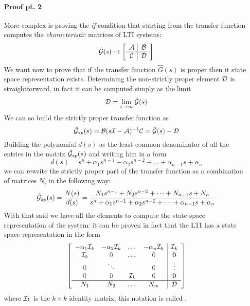 		\paragraph{Proof pt. 2} More complex is proving the \textit{if} condition that starting from the transfer function computes the \textit{characteristic} matrices of LTI systems:
		\[ \hat {\mathcal{G}}(s) \mapsto \begin{bmatrix} \begin{array}{c|c}
				\mathcal{A} & \mathcal{B} \\ \hline \mathcal{C} & \mathcal{D}
		\end{array} \end{bmatrix}  \]
		We want now to prove that if the transfer function $\hat G(s)$ is proper then it state space representation exists. Determining the non-strictly proper element $\mathcal{D}$ is straightforward, in fact it can be computed simply as the limit
		\[ \mathcal D = \lim_{s\rightarrow \infty} \hat {\mathcal{G}}(s) \]
		We can so build the strictly proper transfer function as
		\[ \hat {\mathcal{G}}_{sp}(s) = \mathcal{B}(s\mathcal{I} - \mathcal{A})^{-1}\mathcal{C} = \hat {\mathcal{G}}(s) - \mathcal{D}\]
		Building the polynomial $d(s)$ as the least common denominator of all the entries in the matrix $\hat {\mathcal{G}}_{sp}(s)$ and writing him in a form
		\[ d(s) = s^n + \alpha_1 s^{n-1} + \alpha_2 s^{n-2}+ \dots + \alpha_{n-1} s + \alpha_n \]
		we can rewrite the strictly proper part of the transfer function as a combination of matrices $N_i$ in the following way:
		\[ \hat {\mathcal{G}}_{sp}(s) = \frac{N(s)}{d(s)} = \frac{N_1 s^{n-1} + N_2 s^{n-2} + \dots + N_{n-1} s + N_n }{ s^n + \alpha_1 s^{n-1} + \alpha_2 s^{n-2}+ \dots + \alpha_{n-1} s + \alpha_n} \]
		With that said we have all the elements to compute the state space representation of the system: it can be proven in fact that the LTI has a state space representation in the form
		\begin{equation} \label{eq:dyn:Gtostaterep}
			\begin{bmatrix} \begin{array}{ c c c c | c}
				-\alpha_1 \mathcal{I}_k & - \alpha_2 \mathcal{I}_k & \dots & - \alpha_n \mathcal{I}_k & \mathcal{I}_k \\
				\mathcal{I}_k & 0 & \dots & 0 & 0 \\
				0 & \ddots & & 0 & \vdots \\
				0 & 0& \mathcal{I}_k & 0 & 0 \\ \hline
				N_1 & N_2 & \dots & N_m & \mathcal{D}
			\end{array} \end{bmatrix}
		\end{equation}
		where $\mathcal{I}_k$ is the $k\times k$ identity matrix; this notation is called .
		
